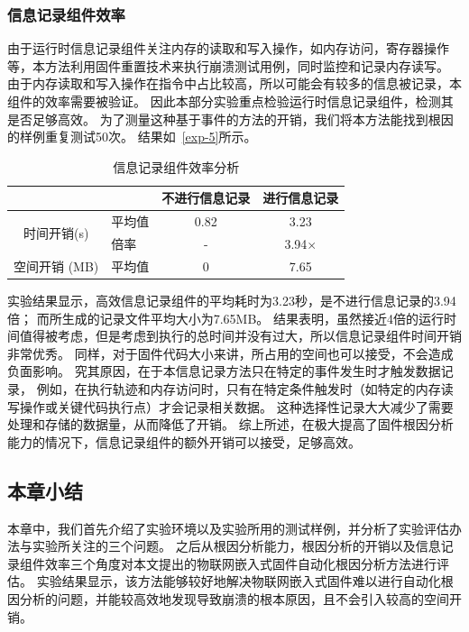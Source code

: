 \subsubsection{信息记录组件效率}
由于运行时信息记录组件关注内存的读取和写入操作，如内存访问，寄存器操作等，本方法利用固件重置技术来执行崩溃测试用例，同时监控和记录内存读写。
由于内存读取和写入操作在指令中占比较高，所以可能会有较多的信息被记录，本组件的效率需要被验证。
因此本部分实验重点检验运行时信息记录组件，检测其是否足够高效。
为了测量这种基于事件的方法的开销，我们将本方法能找到根因的样例重复测试50次。
结果如~\autoref{exp-5}所示。
\begin{table}[ht]
    \centering
    \caption{信息记录组件效率分析}
    \begin{tabular}{@{}clcc@{}}
        \toprule
        \multicolumn{1}{l}{}      &            & 不进行信息记录 & 进行信息记录 \\ \midrule
        \multirow{2}{*}{时间开销(s)} & 平均值    & 0.82      & 3.23        \\ \cmidrule(l){2-4} 
                          & 倍率 &  -       & 3.94$\times{}$   \\ \midrule
        空间开销 (MB)                & 平均值    & 0         & 7.65        \\ \bottomrule
    \end{tabular}
    \label{exp-5}
\end{table}

实验结果显示，高效信息记录组件的平均耗时为3.23秒，是不进行信息记录的3.94倍；
而所生成的记录文件平均大小为7.65MB。
结果表明，虽然接近4倍的运行时间值得被考虑，但是考虑到执行的总时间并没有过大，所以信息记录组件时间开销非常优秀。
同样，对于固件代码大小来讲，所占用的空间也可以接受，不会造成负面影响。
究其原因，在于本信息记录方法只在特定的事件发生时才触发数据记录，
例如，在执行轨迹和内存访问时，只有在特定条件触发时（如特定的内存读写操作或关键代码执行点）才会记录相关数据。
这种选择性记录大大减少了需要处理和存储的数据量，从而降低了开销。
综上所述，在极大提高了固件根因分析能力的情况下，信息记录组件的额外开销可以接受，足够高效。
\subsection{本章小结}
本章中，我们首先介绍了实验环境以及实验所用的测试样例，并分析了实验评估办法与实验所关注的三个问题。
之后从根因分析能力，根因分析的开销以及信息记录组件效率三个角度对本文提出的物联网嵌入式固件自动化根因分析方法进行评估。
实验结果显示，该方法能够较好地解决物联网嵌入式固件难以进行自动化根因分析的问题，并能较高效地发现导致崩溃的根本原因，且不会引入较高的空间开销。
\cleardoublepage
